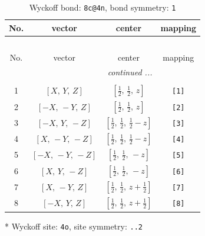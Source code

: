 \documentclass[fleqn,8pt]{jsarticle}
\begin{document}
\renewcommand{\arraystretch}{1.2}
\begin{longtable}{cccc}
\caption{Wyckoff bond: {\tt 8c@4n}, bond symmetry: {\tt 1}}
 \\
 \hline \hline
No. & vector & center & mapping \\ \hline \endfirsthead

\multicolumn{3}{l}{\tablename\ \thetable{}} \\
 \hline \hline
No. & vector & center & mapping \\ \hline \endhead

 \hline \hline
\multicolumn{3}{r}{\footnotesize\it continued ...} \\ \endfoot

 \hline \hline
\multicolumn{3}{r}{} \\ \endlastfoot

1 & $\left[ X,\, Y,\, Z \right]$ & $\left[ \frac{1}{2},\, \frac{1}{2},\, z \right]$ & {\tt [1]} \\ \hline
2 & $\left[ - X,\, - Y,\, Z \right]$ & $\left[ \frac{1}{2},\, \frac{1}{2},\, z \right]$ & {\tt [2]} \\ \hline
3 & $\left[ - X,\, Y,\, - Z \right]$ & $\left[ \frac{1}{2},\, \frac{1}{2},\, \frac{1}{2} - z \right]$ & {\tt [3]} \\ \hline
4 & $\left[ X,\, - Y,\, - Z \right]$ & $\left[ \frac{1}{2},\, \frac{1}{2},\, \frac{1}{2} - z \right]$ & {\tt [4]} \\ \hline
5 & $\left[ - X,\, - Y,\, - Z \right]$ & $\left[ \frac{1}{2},\, \frac{1}{2},\, - z \right]$ & {\tt [5]} \\ \hline
6 & $\left[ X,\, Y,\, - Z \right]$ & $\left[ \frac{1}{2},\, \frac{1}{2},\, - z \right]$ & {\tt [6]} \\ \hline
7 & $\left[ X,\, - Y,\, Z \right]$ & $\left[ \frac{1}{2},\, \frac{1}{2},\, z + \frac{1}{2} \right]$ & {\tt [7]} \\ \hline
8 & $\left[ - X,\, Y,\, Z \right]$ & $\left[ \frac{1}{2},\, \frac{1}{2},\, z + \frac{1}{2} \right]$ & {\tt [8]} \\
\end{longtable}
* Wyckoff site: {\tt 4o}, site symmetry: {\tt ..2}
\renewcommand{\arraystretch}{1.2}
\end{document}
